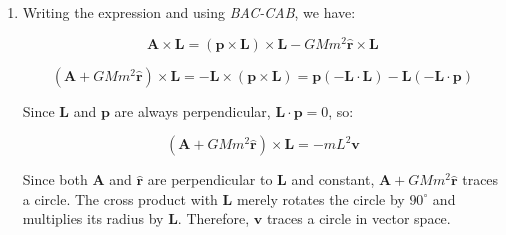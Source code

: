 \documentclass[11pt]{article}
\begin{document}
\begin{pproblem}
\begin{pssolution*}{}{}
\begin{enumerate}[label=\textbf{\Roman*.}]
            Therefore, \(\mathbf{A}\) is constant!

            \item Writing the expression and using \textit{BAC-CAB}, we have:
            
            \[\mathbf{A}\times\mathbf{L} = (\mathbf{p}\times\mathbf{L})\times\mathbf{L} - GMm^2\mathbf{\hat{r}}\times\mathbf{L}\]

            \[(\mathbf{A} +GMm^2\mathbf{\hat{r}})\times\mathbf{L} = - \mathbf{L}\times(\mathbf{p}\times\mathbf{L}) = \mathbf{p}(-\mathbf{L}\cdot\mathbf{L})-\mathbf{L}(-\mathbf{L}\cdot\mathbf{p})\]

            Since \(\mathbf{L}\) and \(\mathbf{p}\) are always perpendicular, \(\mathbf{L}\cdot\mathbf{p}=0\), so:

            \[(\mathbf{A}+GMm^2\mathbf{\hat{r}})\times\mathbf{L} = -mL^2\mathbf{v}\]

            Since both \(\mathbf{A}\) and \(\mathbf{\hat{r}}\) are perpendicular to \(\mathbf{L}\) and constant, \(\mathbf{A}+GMm^2\mathbf{\hat{r}}\) traces a circle. The cross product with \(\mathbf{L}\) merely rotates the circle by \(90^\circ\) and multiplies its radius by \(\mathbf{L}\). Therefore, \(\mathbf{v}\) traces a circle in vector space.
            
        \end{enumerate}
    \end{pssolution*}
\end{pproblem}
\end{document}
